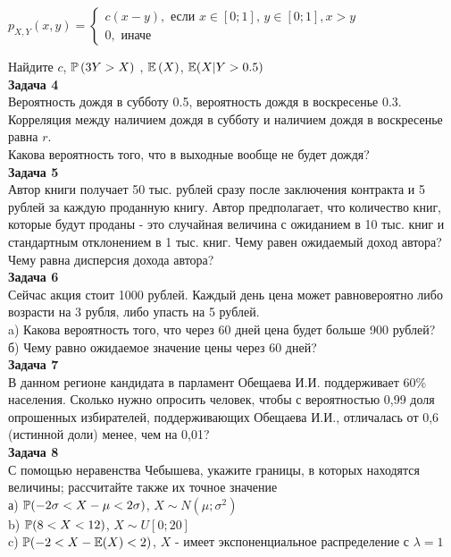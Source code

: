 \documentclass[pdftex,12pt,a4paper]{article}
\begin{document}
$p_{X,Y} \left(x,y\right)=\left\{\begin{array}{l} {c(x-y),
\text{ если } x\in \left[0;1\right],\, y\in \left[0;1\right], x>y} \\
{0,\text{ иначе} } \end{array}\right. $

Найдите  $c$, $\P\left(3Y>X\right)$ ,  $\E\left(X\right)$, $\E(X|Y>0.5)$ \\



\textbf{Задача 4} \\ 
Вероятность дождя в субботу 0.5, вероятность дождя в воскресенье 0.3. Корреляция между наличием дождя в субботу и наличием дождя в воскресенье равна $r$. \\
Какова вероятность того, что в выходные вообще не будет дождя? \\



\textbf{Задача 5} \\ %
Автор книги получает 50 тыс. рублей сразу после заключения
контракта и 5 рублей за каждую проданную книгу. Автор
предполагает, что количество книг, которые будут проданы - это
случайная величина с ожиданием в 10 тыс. книг и стандартным
отклонением в 1 тыс. книг. Чему равен ожидаемый доход автора? Чему
равна дисперсия дохода автора?\\



\textbf{Задача 6} \\ %
Сейчас акция стоит 1000 рублей. Каждый день цена может равновероятно либо возрасти на 3 рубля, либо упасть на 5 рублей. \\
a) Какова вероятность того, что через 60 дней цена будет больше 900 рублей? \\
б) Чему равно ожидаемое значение цены через 60 дней? \\


\textbf{Задача 7} \\ %
 В данном регионе кандидата в парламент Обещаева И.И.
поддерживает 60\% населения. Сколько нужно опросить человек, чтобы
с вероятностью 0,99 доля  опрошенных избирателей, поддерживающих
Обещаева И.И.,  отличалась от 0,6 (истинной доли) менее, чем на
0,01? \\


\textbf{Задача 8} \\ %
С помощью неравенства Чебышева, укажите границы, в которых
находятся величины; рассчитайте также их точное значение \\
а) $\P(-2\sigma<X-\mu<2\sigma)$, $X\sim N(\mu;\sigma^{2})$ \\
b) $\P(8<X<12)$, $X\sim U[0;20]$ \\
c) $\P(-2<X-\E(X)<2)$, $X$ - имеет экспоненциальное распределение с
$\lambda=1$
\end{document}
